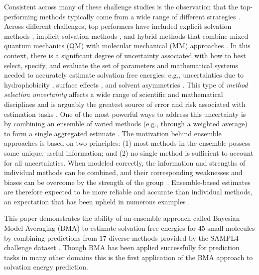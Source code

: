 \documentclass[journal=jpcbfk, manuscript=article]{achemso}
\newcommand{\+}[1]{\ensuremath{\mathbf{#1}}}
\begin{document}
Consistent across many of these challenge studies is the observation that the top-performing methods typically come from a wide range of different strategies \cite{Nicholls:2008, Mobley:2009b, Mobley:2009, Mobley:2014}.
Across different challenges, top performers have included explicit solvation methods \cite{Klimovich:2010, Levy:1998, Mobley:2009c}, implicit solvation methods \cite{Mennucci:2007,Jorgensen:2004}, and hybrid methods that combine mixed quantum mechanics (QM) with molecular mechanical (MM) approaches \cite{Konig:2014, Kamerlin:2009}.
In this context, there is a significant degree of uncertainty associated with how to best select, specify, and evaluate the set of parameters and mathematical systems needed to accurately estimate solvation free energies: e.g., uncertainties due to hydrophobicity \cite{Ashbaugh:1999}, surface effects \cite{Chorny:05}, and solvent asymmetries \cite{Mobley:08}.  This type of \emph{method selection uncertainty} affects a wide range of scientific and mathematical disciplines and is arguably the greatest source of error and risk associated with estimation tasks \cite{Rojas:2010, Apostolakis:1990, Devooght:1998, Neuman:2003}.
One of the most powerful ways to address this uncertainty is by combining an ensemble of varied methods (e.g., through a weighted average) to form a single aggregated estimate \cite{Bates:1969, Opitz:1999, Rokach:2010, Hoeting:1999}.
The motivation behind ensemble approaches is based on two principles: (1) most methods in the ensemble possess some unique, useful information; and (2) no single method is sufficient to account for all uncertainties.
When modeled correctly, the information and strengths of individual methods can be combined, and their corresponding weaknesses and biases can be overcome by the strength of the group~\cite{Seni:2010, Hoeting:1999,Raftery:1998,Raftery:1995}.  
Ensemble-based estimates are therefore expected to be more reliable and accurate than individual methods, an expectation that has been upheld in numerous examples \cite{Gosink:2014, Zhang:2003, Bates:1969, Morales-Casique:2010, Opitz:1999, Rokach:2010, Hoeting:1999, Seni:2010, Raftery:2005, Vlachopoulo:2013, Seni:2010, Hoeting:1999, Raftery:1998, Raftery:1995}.

This paper demonstrates the ability of an ensemble approach called Bayesian Model Averaging (BMA) \cite{Hoeting:1999} to estimate solvation free energies for 45 small molecules by combining predictions from 17 diverse methods provided by the SAMPL4 challenge dataset \cite{Mobley:2014}.
Though BMA has been applied successfully for prediction tasks in many other domains \cite{Ye:2004, Vlachopoulo:2013, Raftery:2005, Morales-Casique:2010, Gosink:2014} this is the first application of the BMA approach to solvation energy prediction.
\end{document}
